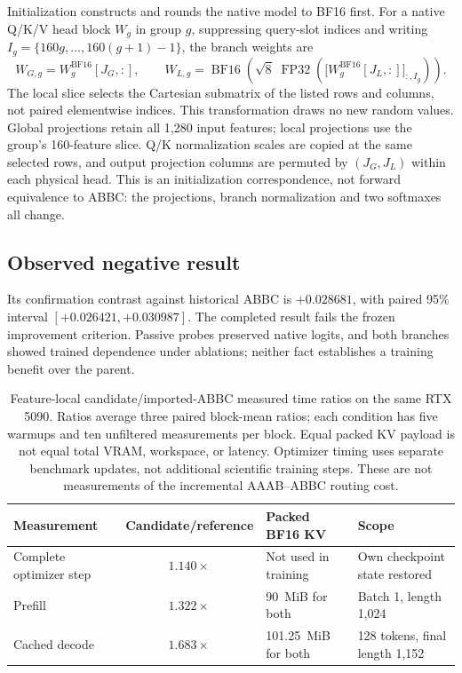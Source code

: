 \documentclass[11pt,letterpaper]{article}
\newcommand{\route}[1]{\textsf{#1}}
\newcommand{\DeltaLocal}{0.028681}
\newcommand{\LowLocal}{0.026421}
\newcommand{\HighLocal}{0.030987}
\newcommand{\RatioStep}{1.140}
\newcommand{\RatioPrefill}{1.322}
\newcommand{\RatioDecode}{1.683}
\newcommand{\CachePrefill}{90}
\newcommand{\CacheDecode}{101.25}
\begin{document}
Initialization constructs and rounds the native model to BF16 first.
For a native Q/K/V head block $W_g$ in group $g$, suppressing query-slot
indices and writing
$I_g=\{160g,\ldots,160(g+1)-1\}$, the branch weights are
\begin{equation}
 W_{G,g}=W_g^{\mathrm{BF16}}[J_G,:],\qquad
 W_{L,g}=\operatorname{BF16}\!\left(
 \sqrt{8}\;\operatorname{FP32}\!\left(
      \bigl[W_g^{\mathrm{BF16}}[J_L,:]\bigr]_{:,I_g}\right)\right).
 \label{eq:compound-init}
\end{equation}
The local slice selects the Cartesian submatrix of the listed rows and
columns, not paired elementwise indices. This transformation draws no new random values. Global projections retain
all 1,280 input features; local projections use the group's 160-feature slice.
Q/K normalization scales are copied at the same selected rows, and output
projection columns are permuted by $(J_G,J_L)$ within each physical head.
This is an initialization correspondence, not forward equivalence to ABBC:
the projections, branch normalization and two softmaxes all change.

\subsection{Observed negative result}
Its confirmation contrast against historical \route{ABBC} is
$+\DeltaLocal$, with paired 95\% interval $[+\LowLocal,+\HighLocal]$.
The completed result fails the frozen improvement criterion. Passive probes
preserved native logits, and both branches showed trained dependence under
ablations; neither fact establishes a training benefit over the parent.

\begin{table}[!ht]
\centering
\small
\begin{tabularx}{\textwidth}{@{}lclY@{}}
\toprule
Measurement & Candidate/reference & Packed BF16 KV & Scope \\
\midrule
Complete optimizer step & $\RatioStep\times$ & Not used in training & Own checkpoint state restored \\
Prefill & $\RatioPrefill\times$ & \CachePrefill\ MiB for both & Batch 1, length 1,024 \\
Cached decode & $\RatioDecode\times$ & \CacheDecode\ MiB for both & 128 tokens, final length 1,152 \\
\bottomrule
\end{tabularx}
\caption{Feature-local candidate/imported-\route{ABBC} measured time
ratios on the same RTX 5090. Ratios average
three paired block-mean ratios; each condition has five warmups and ten
unfiltered measurements per block. Equal packed KV payload is not equal total
VRAM, workspace, or latency. Optimizer timing uses separate benchmark updates,
not additional scientific training steps. These are not measurements of the
incremental AAAB--ABBC routing cost.}
\label{tab:systems}
\end{table}
\end{document}
